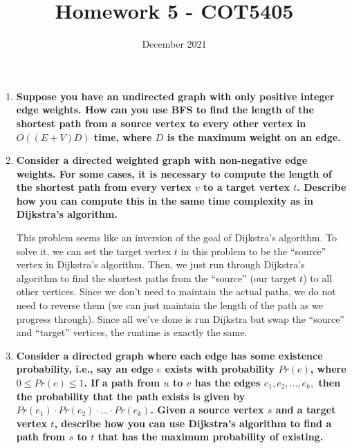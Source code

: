\documentclass[12pt]{article}
\title{Homework 5 - COT5405}
\date{December 2021}
\begin{document}
    \maketitle

    \begin{enumerate}
        \item \textbf{Suppose you have an undirected graph with only positive integer edge weights. How can you use BFS to find 
        the length of the shortest path from a source vertex to every other vertex in $O((E+V)D)$ time, where $D$ is the 
        maximum weight on an edge.}

        \item \textbf{Consider a directed weighted graph with non-negative edge weights. For some cases, it is necessary 
        to compute the length of the shortest path from every vertex $v$ to a target vertex $t$. Describe how you can 
        compute this in the same time complexity as in Dijkstra's algorithm.}

        This problem seems like an inversion of the goal of Dijkstra's algorithm. To solve it, we can set the 
        target vertex $t$ in this problem to be the ``source'' vertex in Dijkstra's algorithm. Then, we just run through 
        Dijkstra's algorithm to find the shortest paths from the ``source'' (our target $t$) to all other vertices. 
        Since we don't need to maintain the actual paths, we do not need to reverse them (we can just maintain the length 
        of the path as we progress through). Since all we've done is run Dijkstra but swap the ``source'' and ``target'' 
        vertices, the runtime is exactly the same.

        \item \textbf{Consider a directed graph where each edge has some existence probability, i.e., say an edge $e$ 
        exists with probability $Pr(e)$, where $0 \leq Pr(e) \leq 1$. If a path from $u$ to $v$ has the edges 
        $e_1, e_2, ..., e_k, $ then the probability that the path exists is given by $Pr(e_1) \cdot Pr(e_2) \cdot ... 
        \cdot Pr(e_k)$. Given a source vertex $s$ and a target vertex $t$, describe how you can use Dijkstra's algorithm 
        to find a path from $s$ to $t$ that has the maximum probability of existing.}

    \end{enumerate}
\end{document}
